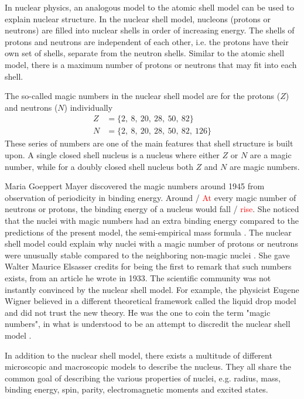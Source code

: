 \documentclass[twoside,english]{uiofysmaster/uiofysmaster}
\begin{document}
In nuclear physics, an analogous model to the atomic shell model can be used to explain nuclear structure.
In the nuclear shell model, nucleons (protons or neutrons) are filled into nuclear shells in order of increasing energy. 
The shells of protons and neutrons are independent of each other, i.e. the protons have their own set of shells, separate from the neutron shells.
Similar to the atomic shell model, there is a maximum number of protons or neutrons that may fit into each shell. 
 
The so-called magic numbers in the nuclear shell model are for the protons ($Z$) and neutrons ($N$) individually
\begin{align*}
	Z &= \{ 2, ~8, ~20, ~28, ~50, ~82 \} \\
	N &= \{ 2, ~8, ~20, ~28, ~50, ~82, ~126 \}
\end{align*}
These series of numbers are one of the main features that shell structure is built upon. 
A single closed shell nucleus is a nucleus where either $Z$ or $N$ are a magic number, while for a doubly closed shell nucleus both $Z$ and $N$ are magic numbers. 

Maria Goeppert Mayer discovered the magic numbers around 1945 from observation of periodicity in binding energy. 
Around / \textcolor{red}{At} every magic number of neutrons or protons, the binding energy of a nucleus would fall / \textcolor{red}{rise}. 
She noticed that the nuclei with magic numbers had an extra binding energy compared to the predictions of the present model, the semi-empirical mass formula \cite{NR}. 
The nuclear shell model could explain why nuclei with a magic number of protons or neutrons were unusually stable compared to the neighboring non-magic nuclei \cite{Mayer1964}. 
She gave Walter Maurice Elsasser credits for being the first to remark that such numbers exists, from an article he wrote in 1933. 
The scientific community was not instantly convinced by the nuclear shell model.
For example, the physicist Eugene Wigner believed in a different theoretical framework called the liquid drop model and did not trust the new theory. 
He was the one to coin the term "magic numbers", in what is understood to be an attempt to discredit the nuclear shell model \cite{Mayer1964, MIT-OCW}.

In addition to the nuclear shell model, there exists a multitude of different microscopic and macroscopic models to describe the nucleus. 
They all share the common goal of describing the various properties of nuclei, e.g. radius, mass, binding energy, spin, parity, electromagnetic moments and excited states.
\end{document}

